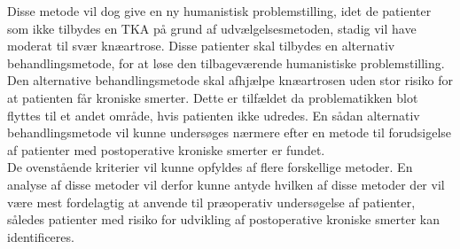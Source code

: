 Disse metode vil dog give en ny humanistisk problemstilling, idet de patienter som ikke tilbydes en TKA på grund af udvælgelsesmetoden, stadig vil have moderat til svær knæartrose. Disse patienter skal tilbydes en alternativ behandlingsmetode, for at løse den tilbageværende humanistiske problemstilling. Den alternative behandlingsmetode skal afhjælpe knæartrosen uden stor risiko for at patienten får kroniske smerter. Dette er tilfældet da problematikken blot flyttes til et andet område, hvis patienten ikke udredes. En sådan alternativ behandlingsmetode vil kunne undersøges nærmere efter en metode til forudsigelse af patienter med postoperative kroniske smerter er fundet. \\  
De ovenstående kriterier vil kunne opfyldes af flere forskellige metoder. En analyse af disse metoder vil derfor kunne antyde hvilken af disse metoder der vil være mest fordelagtig at anvende til præoperativ undersøgelse af patienter, således patienter med risiko for udvikling af postoperative kroniske smerter kan identificeres.        

